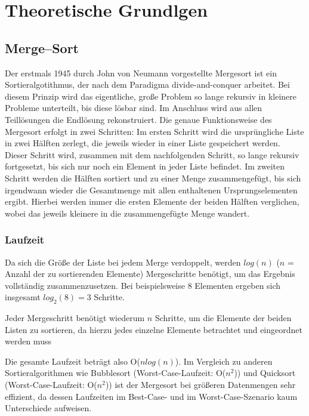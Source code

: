 \chapter{Theoretische Grundlgen}\label{chap:theoretische-grundlagen}

\section{Merge--Sort}
Der erstmals 1945 durch John von Neumann vorgestellte Mergesort ist ein Sortieralgotithmus, der nach dem Paradigma divide-and-conquer arbeitet. Bei diesem Prinzip wird das eigentliche, große Problem so lange rekursiv in kleinere Probleme unterteilt, bis diese lösbar sind. Im Anschluss wird aus allen Teillösungen die Endlösung rekonstruiert. Die genaue Funktionsweise des Mergesort erfolgt in zwei Schritten: Im ersten Schritt wird die ursprüngliche Liste in zwei Hälften zerlegt, die jeweils wieder in einer Liste gespeichert werden. Dieser Schritt wird, zusammen mit dem nachfolgenden Schritt, so lange rekursiv fortgesetzt, bis sich nur noch ein Element in jeder Liste befindet. Im zweiten Schritt werden die Hälften sortiert und zu einer Menge zusammengefügt, bis sich irgendwann wieder die Gesamtmenge mit allen enthaltenen Ursprungselementen ergibt. Hierbei werden immer die ersten Elemente der beiden Hälften verglichen, wobei das jeweils kleinere in die zusammengefügte Menge wandert.


\subsection{Laufzeit}

Da sich die Größe der Liste bei jedem Merge verdoppelt, werden $log(n)$ ($n$ = Anzahl der zu sortierenden Elemente) Mergeschritte benötigt, um das Ergebnis vollständig zusammenzusetzen. Bei beispielsweise 8 Elementen ergeben sich insgesamt $log_2 (8) = 3$ Schritte.

Jeder Mergeschritt benötigt wiederum $n$ Schritte, um die Elemente der beiden Listen zu sortieren, da hierzu jedes einzelne Elemente betrachtet und eingeordnet werden muss

Die gesamte Laufzeit beträgt also O($n log (n) $). Im Vergleich zu anderen Sortieralgorithmen wie Bubblesort (Worst-Case-Laufzeit: O($n^2$)) und Quicksort (Worst-Case-Laufzeit: O($n^2$)) ist der Mergesort bei größeren Datenmengen sehr effizient, da dessen Laufzeiten im Best-Case- und im Worst-Case-Szenario kaum Unterschiede aufweisen.

